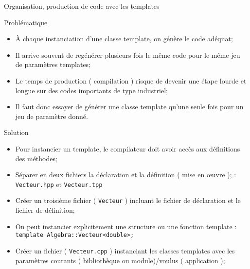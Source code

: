 \documentclass[handout,10pt]{beamer}
\begin{document}
\begin{frame}[fragile]{Organisation, production de code avec les templates}
\scriptsize
\begin{block}{Problématique}
\begin{itemize}
\item À chaque instanciation d'une classe template, on génère le code adéquat;
\item Il arrive souvent de regénérer plusieurs fois le même code pour le même jeu de paramètres templates;
\item Le temps de production ( compilation ) risque de devenir une étape lourde et longue sur des codes importants de type industriel;
\item Il faut donc essayer de générer une classe template qu'une seule fois pour un jeu de paramètre donné.
\end{itemize}
\end{block}

\begin{exampleblock}{Solution}
\begin{itemize}
\item Pour instancier un template, le compilateur doit avoir accès aux définitions des méthodes;
\item {\color{blue}Séparer en deux fichiers la déclaration et la définition ( mise en {\oe}uvre ); : \lstinline$Vecteur.hpp$ et \lstinline$Vecteur.tpp$}
\item {\color{red}Créer un troisième fichier ( \lstinline$Vecteur$ ) incluant le fichier de déclaration et le fichier de définition};
\item On peut instancier explicitement une structure ou une fonction template : \lstinline$template Algebra::Vecteur<double>;$
\item {\color{blue}Créer un fichier ( \lstinline$Vecteur.cpp$ ) instanciant les classes templates avec les paramètres courants ( bibliothèque ou module)/voulus ( application )};
\end{itemize}
\end{exampleblock}
\end{frame}
\end{document}
